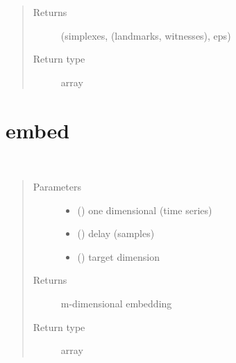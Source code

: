\documentclass[letterpaper,10pt,openany,oneside,english]{sphinxmanual}
\begin{document}
\begin{fulllineitems}
\begin{quote}
\begin{description}
\begin{itemize}
\end{itemize}

\item[{Returns}] \leavevmode
(simplexes, (landmarks, witnesses), eps)

\item[{Return type}] \leavevmode
array

\end{description}\end{quote}

\end{fulllineitems}



\section{embed}
\label{\detokenize{embed:module-embed}}\label{\detokenize{embed:embed}}\label{\detokenize{embed::doc}}

\begin{fulllineitems}
\label{\detokenize{embed:embed.embed}}~\begin{quote}\begin{description}
\item[{Parameters}] \leavevmode\begin{itemize}
\item {} 
 () \textendash{} one dimensional (time series)

\item {} 
 () \textendash{} delay (samples)

\item {} 
 () \textendash{} target dimension

\end{itemize}

\item[{Returns}] \leavevmode
m-dimensional embedding

\item[{Return type}] \leavevmode
array

\end{description}\end{quote}

\end{fulllineitems}
\end{document}
